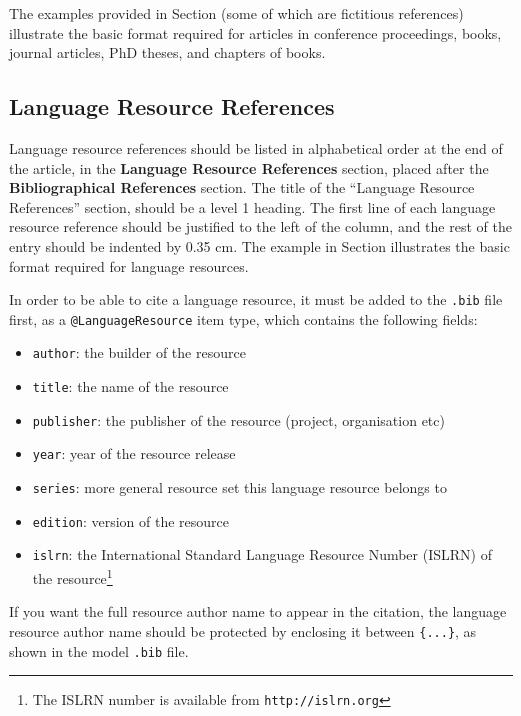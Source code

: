 \documentclass[10pt, a4paper]{article}
\newcommand{\secref}[1]{\StrSubstitute{\getrefnumber{#1}}{.}{ }}
\begin{document}
The examples provided in Section \secref{main:ref} (some of which are fictitious
references) illustrate the basic format required for articles in conference
proceedings, books, journal articles, PhD theses, and chapters of books.

\subsection{Language Resource References}

Language resource references should be listed in alphabetical order at the end
of the article, in the \textbf{Language Resource References} section, placed after
the \textbf{Bibliographical References} section. The title of the ``Language Resource
References'' section, should be a level 1 heading. The first line of each
language resource reference should be justified to the left of the column, and
the rest of the entry should be indented by 0.35 cm. The example in Section 
\secref{lr:ref} illustrates the basic format required for language resources.

In order to be able to cite a language resource, it must be added to
the \texttt{.bib} file first, as a \texttt{@LanguageResource} item type, which
contains the following fields:

\begin{itemize}
    \item{\texttt{author}: the builder of the resource}
    \item{\texttt{title}: the name of the resource}
    \item{\texttt{publisher}: the publisher of the resource (project,
          organisation etc)}
    \item{\texttt{year}: year of the resource release}
    \item{\texttt{series}: more general resource set this language resource
          belongs to}
    \item{\texttt{edition}: version of the resource}
    \item{\texttt{islrn}: the International Standard Language Resource Number
          (ISLRN) of the resource\footnote{The ISLRN number is available from
          \texttt{http://islrn.org}}} 
\end{itemize}

If you want the full resource author name to appear in the citation, the
language resource author name should be protected by enclosing it between
\texttt{\{...\}}, as shown in the model \texttt{.bib} file.
\end{document}
